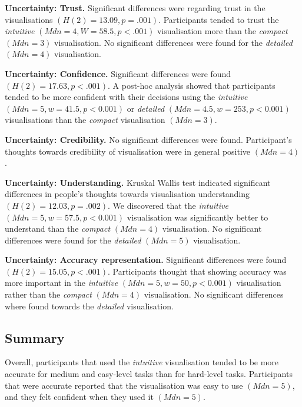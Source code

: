\documentclass[final,5p,times,twocolumn,authoryear]{elsarticle}
\begin{document}
\textbf{Uncertainty: Trust.} Significant differences were regarding trust in the visualisations $(H(2) = 13.09, p = .001)$. Participants tended to trust the \emph{intuitive} $(Mdn = 4, W = 58.5, p < .001)$ visualisation more than the \emph{compact} $(Mdn = 3)$ visualisation. No significant differences were found for the \emph{detailed} $(Mdn = 4)$ visualisation.

\textbf{Uncertainty: Confidence.} Significant differences were found $(H(2) = 17.63, p < .001)$. A post-hoc analysis showed that participants tended to be more confident with their decisions using the \emph{intuitive} $(Mdn = 5, w = 41.5, p < 0.001)$ or \emph{detailed} $(Mdn = 4.5, w = 253, p < 0.001)$ visualisations  than the \emph{compact} visualisation $(Mdn = 3)$.

\textbf{Uncertainty: Credibility.} No significant differences were found. Participant's thoughts towards credibility of visualisation were in general positive $(Mdn = 4)$.


\textbf{Uncertainty: Understanding.}  Kruskal Wallis test indicated significant differences in people's thoughts towards visualisation understanding $(H(2) = 12.03, p = .002)$. We discovered that the \emph{intuitive} $(Mdn = 5,  w=57.5, p < 0.001)$ visualisation   was significantly better to understand than the \emph{compact} $(Mdn = 4)$ visualisation. No significant differences were found for the \emph{detailed} $(Mdn = 5)$ visualisation.

\textbf{Uncertainty: Accuracy representation.} Significant differences were found $(H(2) = 15.05, p < .001)$. Participants thought that showing accuracy was more important in the \emph{intuitive} $(Mdn = 5, w = 50, p < 0.001)$ visualisation rather than the \emph{compact} $(Mdn = 4)$ visualisation. No significant differences where found towards the  \emph{detailed} visualisation.

\subsection{Summary}

Overall, participants that used the \emph{intuitive} visualisation tended to be more accurate for medium and easy-level tasks than for hard-level tasks. Participants that were accurate reported that the visualisation was easy to use $(Mdn = 5)$, and they felt confident when they used it $(Mdn = 5)$.
\end{document}
